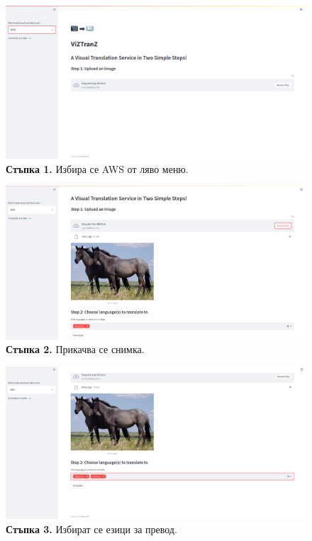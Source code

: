 \documentclass[12pt]{article}
\begin{document}
\begin{figure}[!htp]
\centering
    \includegraphics[scale=0.2]{assets/st1.png}
  \caption{\textbf{Стъпка 1.} Избира се AWS от ляво меню.}
\end{figure}

\begin{figure}[!htp]
\centering
    \includegraphics[scale=0.2]{assets/st2.png}
  \caption{\textbf{Стъпка 2.} Прикачва се снимка.}
\end{figure}

\begin{figure}[!htp]
\centering
    \includegraphics[scale=0.2]{assets/st3.png}
  \caption{\textbf{Стъпка 3.} Избират се езици за превод.}
\end{figure}
\end{document}
